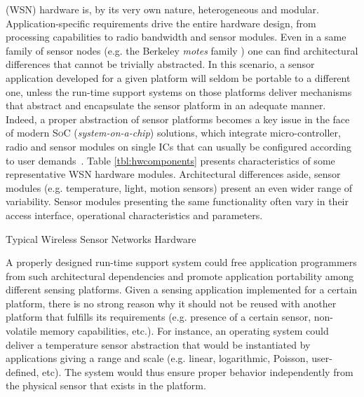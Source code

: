 \wsn{} (WSN) hardware is, by its very own nature, heterogeneous and
modular.  Application-specific requirements drive the entire hardware
design, from processing capabilities to radio bandwidth and sensor
modules.  Even in a same family of sensor nodes (e.g. the Berkeley
\emph{motes} family \cite{Polastre:2005,Hill:2004}) one can find
architectural differences that cannot be trivially abstracted.  
In this scenario, a sensor application developed for a given platform
will seldom be portable to a different one, unless the run-time support
systems on those platforms deliver mechanisms that abstract and
encapsulate the sensor platform in an adequate manner.
Indeed, a proper abstraction of sensor platforms becomes a key issue in
the face of modern \textsc{SoC} (\emph{system-on-a-chip}) solutions,
which integrate micro-controller, radio and sensor modules on single ICs
that can usually be configured according to user
demands~\cite{Rabaey:2002,Atmel:rf:2003,Hill:2003}.  
Table \ref{tbl:hwcomponents} presents characteristics of some
representative WSN hardware modules.  Architectural differences aside,
sensor modules (e.g. temperature, light, motion sensors) present an even
wider range of variability.  Sensor modules presenting the same
functionality often vary in their access interface, operational
characteristics and parameters.


\begin{table*}[tbh]
\begin{center}

\end{center}
\caption{Typical Wireless Sensor Networks  Hardware}
\label{tbl:hwcomponents}
\end{table*}



%

A properly designed run-time support system could free application
programmers from such architectural dependencies and promote application
portability among different  sensing platforms.  Given a sensing
application implemented for a certain platform, there is no strong
reason why it should not be reused with another platform that fulfills
its requirements (e.g. presence of a certain sensor, non-volatile
memory capabilities, etc.).  For instance, an operating system could
deliver a temperature sensor abstraction that would be instantiated by
applications giving a range and scale (e.g. linear, logarithmic,
Poisson, user-defined, etc). The system would thus ensure proper
behavior independently from the physical sensor that exists in the
platform.

